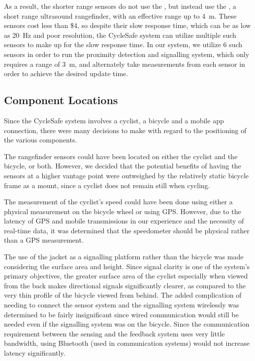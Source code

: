 \documentclass[journal]{IEEEtran}
\begin{document}
\label{sonar_tradeoff}
As a result, the shorter range sensors do not use the \lidar{}, but instead use the \sonar{}, a short range ultrasound rangefinder, with an effective range up to \SI{4}{\meter}. These sensors cost less than \$4, so despite their slow response time, which can be as low as \SI{20}{\Hz} and poor resolution, the CycleSafe system can utilize multiple such sensors to make up for the slow response time. In our system, we utilize 6 such sensors in order to run the proximity detection and signalling system, which only requires a range of \SI{3}{\meter}, and alternately take measurements from each sensor in order to achieve the desired update time.

\subsection{Component Locations}

Since the CycleSafe system involves a cyclist, a bicycle and a mobile app connection, there were many decisions to make with regard to the positioning of the various components.

The rangefinder sensors could have been located on either the cyclist and the bicycle, or both. However, we decided that the potential benefits of having the sensors at a higher vantage point were outweighed by the relatively static bicycle frame as a mount, since a cyclist does not remain still when cycling.

The measurement of the cyclist's speed could have been done using either a physical measurement on the bicycle wheel or using GPS. However, due to the latency of GPS and mobile transmissions in our experience and the necessity of real-time data, it was determined that the speedometer should be physical rather than a GPS measurement.

The use of the jacket as a signalling platform rather than the bicycle was made considering the surface area and height. Since signal clarity is one of the system's primary objectives, the greater surface area of the cyclist especially when viewed from the back makes directional signals significantly clearer, as compared to the very thin profile of the bicycle viewed from behind. The added complication of needing to connect the sensor system and the signalling system wirelessly was determined to be fairly insignificant since wired communication would still be needed even if the signalling system was on the bicycle. Since the communication requirement between the sensing and the feedback system uses very little bandwidth, using Bluetooth (used in communication systems) would not increase latency significantly.
\end{document}
